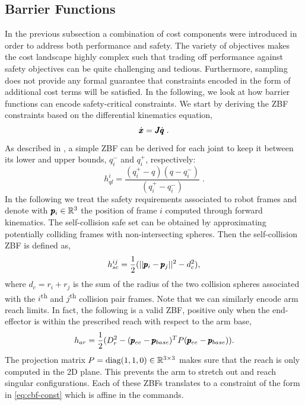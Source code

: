 \subsection{Barrier Functions}
In the previous subsection a combination of cost components were introduced in order to address both performance and safety. The variety of objectives makes the cost landscape highly complex such that trading off performance against safety objectives can be quite challenging and tedious. Furthermore, sampling does not provide any formal guarantee that constraints encoded in the form of additional cost terms will be satisfied. In the following, we look at how barrier functions can encode safety-critical constraints. We start by deriving the ZBF constraints based on the differential kinematics equation,
\begin{equation}
    \dot{\pmb{x}} = \pmb{J} \dot{\pmb{q}}\;.
\end{equation}
As described in \cite{benzi2021optimization}, a simple ZBF can be derived for each joint to keep it between its lower and upper bounds, $q_i^-$ and $q_i^+$, respectively:
\begin{equation}
h_{ql}^i = \frac{(q_i^+ - q)(q - q_i^-)}{(q_i^+ - q_i^-)}\;.
\end{equation}
In the following we treat the safety requirements associated to robot frames and denote with $\pmb{p}_{i} \in \mathbb{R}^{3}$ the position of frame $i$ computed through forward kinematics.  
The self-collision safe set can be obtained by approximating potentially colliding frames with non-intersecting spheres. Then the self-collision ZBF is defined as,
\begin{equation}
    h_{sc}^{ij} = \frac{1}{2}(||\pmb{p}_i - \pmb{p}_j||^2 - d_c^2),
\end{equation}
where $d_c = r_i + r_j$ is the sum of the radius of the two collision spheres associated with the $i$\textsuperscript{th}  and $j$\textsuperscript{th} collision pair frames. Note that we can similarly encode arm reach limits. In fact, the following is a valid ZBF, positive only when the end-effector is within the prescribed reach with respect to the arm base,
\begin{equation}
    h_{ar} = \frac{1}{2}(D_r^2 - (\pmb{p}_{ee} - \pmb{p}_{base})^T P (\pmb{p}_{ee} - \pmb{p}_{base}) ).
\end{equation}
The projection matrix $P = \text{diag}(1, 1, 0) \in \mathbb{R}^{3 \times 3}$ makes sure that the reach is only computed in the 2D plane. This prevents the arm to stretch out and reach singular configurations. Each of these ZBFs translates to a constraint of the form in \eqref{eq:cbf-const} which is affine in the commands. 

